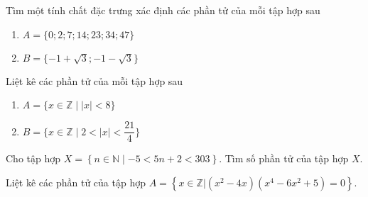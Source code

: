 \begin{bt}%
Tìm một tính chất đặc trưng xác định các phần tử của mỗi tập hợp sau
\begin{enumerate}
\item $A=\{0; 2; 7; 14; 23; 34; 47\}$
\item $B=\{-1+\sqrt{3}; -1-\sqrt{3}\}$
\end{enumerate}
\end{bt}

\begin{bt}%
Liệt kê các phần tử của mỗi tập hợp sau
\begin{enumerate}
\item $A=\{x\in \mathbb{Z} \mid | x | < 8\}$
\item $B=\{x\in \mathbb{Z} \mid 2< | x | < \dfrac{21}{4}\}$
\end{enumerate}
\end{bt}

\begin{bt}%
Cho tập hợp $X = \left\{ n \in \mathbb{N} \mid - 5 < 5n+2 <  303 \right\}$. Tìm số phần tử của tập hợp $X$. 

\end{bt}


\begin{bt}%
	Liệt kê các phần tử của tập hợp $A=\left\{x\in \mathbb{Z}\big|(x^2-4x)(x^4-6x^2+5)=0 \right\}$.
\loigiai{Ta có $(x^2-4x)(x^4-6x^2+5)=0\Leftrightarrow \left [ \begin{aligned} &x^2-4x=0\\ &x^4-6x^2+5=0 \end{aligned} \right .\Leftrightarrow \left [ \begin{aligned} x&=0\\ x&=\pm 1 \\ x&=4\\ x&=\pm \sqrt{5}\end{aligned} \right . $.\\ Từ đó ta có $A=\left\{0; -1; 1; 4\right\}$ chứa $4$ phần tử.}
\end{bt}

